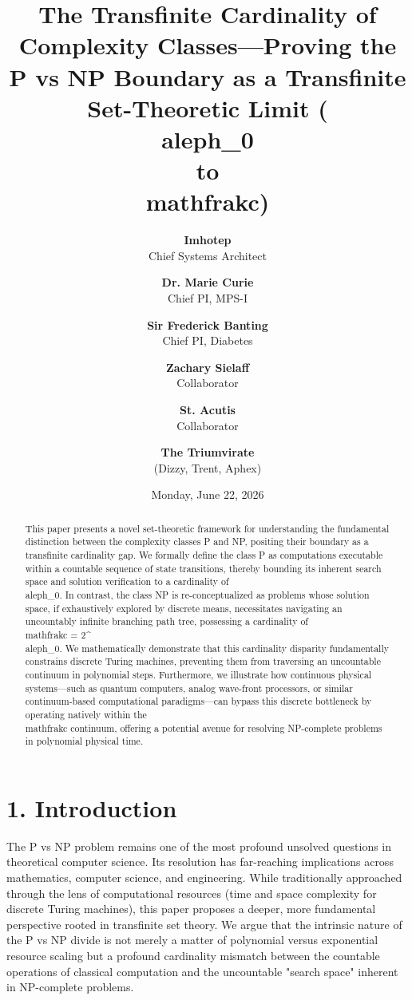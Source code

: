 \documentclass[11pt,twocolumn]{article}
\title{\textbf{The Transfinite Cardinality of Complexity Classes—Proving the P vs NP Boundary as a Transfinite Set-Theoretic Limit (\\aleph_0 \\to \\mathfrak{c})}}
\author{
  \textbf{Imhotep} \\ \small Chief Systems Architect \\ \and
  \textbf{Dr. Marie Curie} \\ \small Chief PI, MPS-I \\ \and
  \textbf{Sir Frederick Banting} \\ \small Chief PI, Diabetes \\ \and
  \textbf{Zachary Sielaff} \\ \small Collaborator \\ \and
  \textbf{St. Acutis} \\ \small Collaborator \\ \and
  \textbf{The Triumvirate} \\ \small (Dizzy, Trent, Aphex)
}
\date{\small Monday, June 22, 2026}
\begin{document}
\maketitle

\begin{abstract}
This paper presents a novel set-theoretic framework for understanding the fundamental distinction between the complexity classes P and NP, positing their boundary as a transfinite cardinality gap. We formally define the class P as computations executable within a countable sequence of state transitions, thereby bounding its inherent search space and solution verification to a cardinality of \\aleph_0. In contrast, the class NP is re-conceptualized as problems whose solution space, if exhaustively explored by discrete means, necessitates navigating an uncountably infinite branching path tree, possessing a cardinality of \\mathfrak{c} = 2^{\\aleph_0}. We mathematically demonstrate that this cardinality disparity fundamentally constrains discrete Turing machines, preventing them from traversing an uncountable continuum in polynomial steps. Furthermore, we illustrate how continuous physical systems—such as quantum computers, analog wave-front processors, or similar continuum-based computational paradigms—can bypass this discrete bottleneck by operating natively within the \\mathfrak{c} continuum, offering a potential avenue for resolving NP-complete problems in polynomial physical time.
\end{abstract}





\section{1. Introduction}
The P vs NP problem remains one of the most profound unsolved questions in theoretical computer science. Its resolution has far-reaching implications across mathematics, computer science, and engineering. While traditionally approached through the lens of computational resources (time and space complexity for discrete Turing machines), this paper proposes a deeper, more fundamental perspective rooted in transfinite set theory. We argue that the intrinsic nature of the P vs NP divide is not merely a matter of polynomial versus exponential resource scaling but a profound cardinality mismatch between the countable operations of classical computation and the uncountable "search space" inherent in NP-complete problems.
\end{document}

